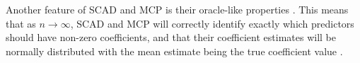 \documentclass[final,onefignum,onetabnum]{siuro210301}
\begin{document}

	Another feature of SCAD and MCP is their oracle-like properties \cite{fan2001variable, zhang2010nearly}. This means that as $n\to\infty$, SCAD and MCP will correctly identify exactly which predictors should have non-zero coefficients, and that their coefficient estimates will be normally distributed with the mean estimate being the true coefficient value \cite{zou2006adaptive}.
	
\end{document}
